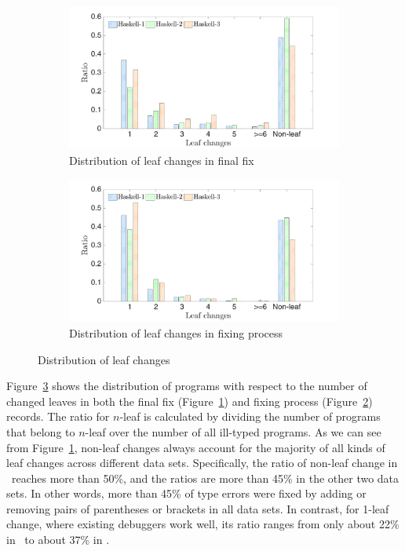 \documentclass[12pt]{report}	%
\begin{document}
\begin{figure}
    \centering
    \begin{subfigure}[t]{0.85\textwidth}
        \centering
        \includegraphics[width=0.95\columnwidth]{images/leaf-final.pdf}
        \caption{Distribution of leaf changes in final fix}
        \label{fig:leaf-chg-dist:final}
    \end{subfigure}
    
    \begin{subfigure}[t]{0.85\textwidth}
        \centering
        \includegraphics[width=0.95\columnwidth]{images/leaf-process.pdf}
        \caption{Distribution of leaf changes in fixing process}
        \label{fig:leaf-chg-dist:proc}
    \end{subfigure}%
    \caption{Distribution of leaf changes}
    \label{fig:leaf-chg-dist}
\end{figure}

Figure~\ref{fig:leaf-chg-dist} shows the distribution of
programs with respect to the number
of changed leaves in both the final
fix (Figure~\ref{fig:leaf-chg-dist:final})
and fixing process
(Figure~\ref{fig:leaf-chg-dist:proc}) records.
%
The ratio for $n$-leaf is calculated by dividing the number of
programs that belong to $n$-leaf over the number of all
ill-typed programs.
%
As we can see from Figure~\ref{fig:leaf-chg-dist:final},
non-leaf changes always account for the majority
of all kinds of leaf changes across different data sets. 
Specifically, the ratio of non-leaf change in \benchs\
reaches more than 50\%,
and the ratios are more than 45\% in the other two data sets.
In other words, more than
45\% of type errors were fixed
by adding or removing pairs of parentheses or brackets
in all data sets.
%
In contrast, for 1-leaf change, where existing debuggers work
well, its ratio ranges from only about 22\% in \benchs\ to about 37\%
in \benchf.
\end{document}
